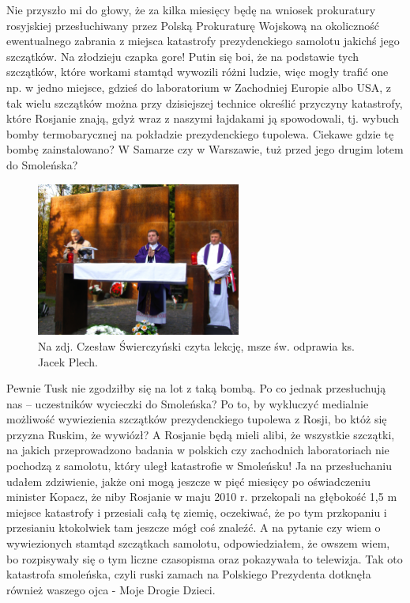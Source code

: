 Nie przyszło mi do głowy, że za kilka miesięcy będę na wniosek prokuratury rosyjskiej przesłuchiwany przez Polską Prokuraturę Wojskową na okoliczność ewentualnego zabrania z miejsca katastrofy prezydenckiego samolotu jakichś jego szczątków. Na złodzieju czapka gore! Putin się boi, że na podstawie tych szczątków, które workami stamtąd wywozili różni ludzie, więc mogły trafić one np. w jedno miejsce, gdzieś do laboratorium w Zachodniej Europie albo USA, z tak wielu szczątków można przy dzisiejszej technice określić przyczyny katastrofy, które Rosjanie znają, gdyż wraz z naszymi łajdakami ją spowodowali, tj. wybuch bomby termobarycznej na pokładzie prezydenckiego tupolewa. Ciekawe gdzie tę bombę zainstalowano? W Samarze czy w Warszawie, tuż przed jego drugim lotem do Smoleńska?
\begin{figure}[!h]
\begin{center}
\includegraphics[width=0.6\textwidth]{photo/czeslaw_swierczynski_katyn_1.jpg}
\caption[Katyń]{Na zdj. Czesław Świerczyński czyta lekcję, msze św. odprawia ks. Jacek Plech.}
\end{center}
\end{figure}

Pewnie Tusk nie zgodziłby się na lot z taką bombą. Po co jednak przesłuchują nas – uczestników wycieczki do Smoleńska? Po to, by wykluczyć medialnie możliwość wywiezienia szczątków prezydenckiego tupolewa z Rosji, bo któż się przyzna Ruskim, że wywiózł? A Rosjanie będą mieli alibi, że wszystkie szczątki, na jakich przeprowadzono badania w polskich czy zachodnich laboratoriach nie pochodzą z samolotu, który uległ katastrofie w Smoleńsku! Ja na przesłuchaniu udałem zdziwienie, jakże oni mogą jeszcze w pięć miesięcy po oświadczeniu minister Kopacz, że niby Rosjanie w maju 2010 r. przekopali na głębokość 1,5 m miejsce katastrofy i przesiali całą tę ziemię, oczekiwać, że po tym przkopaniu i przesianiu ktokolwiek tam jeszcze mógł coś znaleźć. A na pytanie czy wiem o wywiezionych stamtąd szczątkach samolotu, odpowiedziałem, że owszem wiem, bo rozpisywały się o tym liczne czasopisma oraz pokazywała to telewizja. Tak oto katastrofa smoleńska, czyli ruski zamach na Polskiego Prezydenta dotknęła również waszego ojca - Moje Drogie Dzieci.








